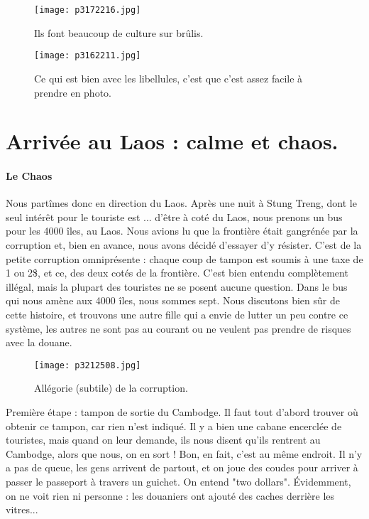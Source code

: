 \documentclass{book}
\begin{document}
\begin{figure}[h]
\centering
\texttt{[image: p3172216.jpg]}
\caption*{Ils font beaucoup de culture sur brûlis.}
\end{figure}


\begin{figure}[h]
\centering
\texttt{[image: p3162211.jpg]}
\caption*{Ce qui est bien avec les libellules, c'est que c'est assez facile à prendre en photo.}
\end{figure}







\chapter{Arrivée au Laos : calme et chaos.}
\subsubsection{Le Chaos}
Nous partîmes donc en direction du Laos. Après une nuit à Stung Treng, dont le seul intérêt pour le touriste est ... d'être à coté du Laos, nous prenons un bus pour les 4000 îles, au Laos. Nous avions lu que la frontière était gangrénée par la corruption et, bien en avance, nous avons décidé d'essayer d'y résister. C'est de la petite corruption omniprésente : chaque coup de tampon est soumis à une taxe de 1 ou 2\$, et ce, des deux cotés de la frontière. C'est bien entendu complètement illégal, mais la plupart des touristes ne se posent aucune question. Dans le bus qui nous amène aux 4000 îles, nous sommes sept. Nous discutons bien sûr de cette histoire, et trouvons une autre fille qui a envie de lutter un peu contre ce système, les autres ne sont pas au courant ou ne veulent pas prendre de risques avec la douane.


\begin{figure}[h]
\centering
\texttt{[image: p3212508.jpg]}
\caption*{Allégorie (subtile) de la corruption.}
\end{figure}

Première étape : tampon de sortie du Cambodge. Il faut tout d'abord trouver où obtenir ce tampon, car rien n'est indiqué. Il y a bien une cabane encerclée de touristes, mais quand on leur demande, ils nous disent qu'ils rentrent au Cambodge, alors que nous, on en sort ! Bon, en fait, c'est au même endroit. Il n'y a pas de queue, les gens arrivent de partout, et on joue des coudes pour arriver à passer le passeport à travers un guichet. On entend "two dollars". Évidemment, on ne voit rien ni personne : les douaniers ont ajouté des caches derrière les vitres...
\end{document}
